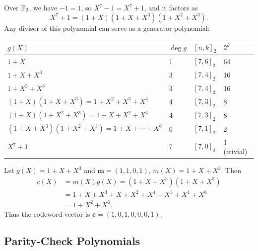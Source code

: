 \begin{example}
Over \(\mathbb{F}_2\), we have \(-1=1\), so \(X^7-1 = X^7+1\), and it factors as
\[X^7+1 = (1+X)(1+X+X^3)(1+X^2+X^3).\]
Any divisor of this polynomial can serve as a generator polynomial:
\begin{center}
\renewcommand{\arraystretch}{1.2}
\begin{tabular}{@{}p{6cm}lll@{}}
	\toprule
	\(g(X)\) & \(\deg g\) & \([n,k]_2\) & \(2^k\) \\
	\midrule
	\(1 + X\) & 1 & \([7,6]_2\) & 64 \\
	\(1 + X + X^3\) & 3 & \([7,4]_2\) & 16 \\
	\(1 + X^2 + X^3\) & 3 & \([7,4]_2\) & 16 \\
	\((1+X)(1+X+X^3) = 1 + X^2 + X^3 + X^4\) & 4 & \([7,3]_2\) & 8 \\
	\((1+X)(1+X^2+X^3) = 1 + X + X^2 + X^4\) & 4 & \([7,3]_2\) & 8 \\
	\((1+X+X^3)(1+X^2+X^3) = 1 + X + \cdots + X^6\) & 6 & \([7,1]_2\) & 2 \\
	\(X^7 + 1\) & 7 & \([7,0]_2\) & 1 (trivial) \\
	\bottomrule
\end{tabular}
\end{center}
\end{example}

\begin{example}
Let \(g(X)=1+X+X^3\) and \(\mathbf{m}=(1,1,0,1)\), \(m(X)=1+X+X^3\). Then
\begin{align*}
c(X)
&= m(X)g(X) = (1+X+X^3)(1+X+X^3) \\
&= 1+X+X^3 + X+X^2+X^4 + X^3+X^4+X^6 \\
&= 1 + X^2 + X^6.
\end{align*}
Thus the codeword vector is \(\mathbf{c}=(1,0,1,0,0,0,1)\).
\end{example}

\newpage
\subsection{Parity-Check Polynomials}



